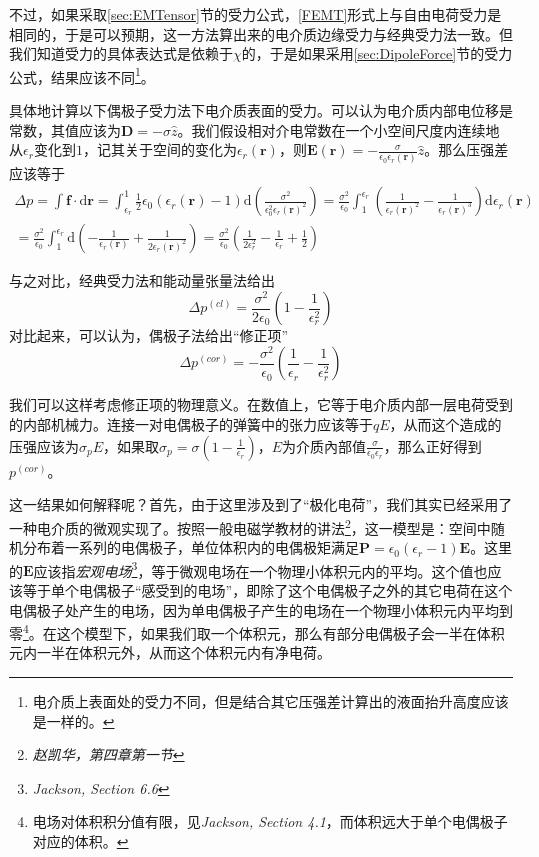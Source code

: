 \documentclass{ctexart}
\newcommand{\epsz}{\epsilon_0}
\newcommand{\epsr}{\epsilon_r}
\begin{document}
	不过，如果采取\ref{sec:EMTensor}节的受力公式，\eqref{FEMT}形式上与自由电荷受力是相同的，于是可以预期，这一方法算出来的电介质边缘受力与经典受力法一致。但我们知道受力的具体表达式是依赖于$\chi$的，于是如果采用\ref{sec:DipoleForce}节的受力公式，结果应该不同\footnote{电介质上表面处的受力不同，但是结合其它压强差计算出的液面抬升高度应该是一样的。}。
	
	具体地计算以下偶极子受力法下电介质表面的受力。可以认为电介质内部电位移是常数，其值应该为$\mathbf D=-\sigma\hat z$。我们假设相对介电常数在一个小空间尺度内连续地从$\epsr$变化到$1$，记其关于空间的变化为$\epsr(\mathbf r)$，则$\mathbf E(\mathbf r)=-\frac{\sigma}{\epsz\epsr(\mathbf r)}\hat z$。那么压强差应该等于
	\begin{multline}
	\Delta p=\int \mathbf f\cdot\mathrm d\mathbf r=\int_{\epsr}^1 \frac{1}{2}\epsz(\epsr(\mathbf r)-1)\mathrm d\left(\frac{\sigma^2}{\epsz^2\epsr(\mathbf r)^2}\right)=\frac{\sigma^2}{\epsz}\int_1^{\epsr}\left(\frac{1}{\epsr(\mathbf r)^2}-\frac{1}{\epsr(\mathbf r)^3}\right)\mathrm d\epsr(\mathbf r)\\
	=\frac{\sigma^2}{\epsz}\int_1^{\epsr}\mathrm d\left(-\frac{1}{\epsr(\mathbf r)}+\frac{1}{2\epsr(\mathbf r)^2}\right)=\frac{\sigma^2}{\epsz}\left(\frac{1}{2\epsr^2}-\frac{1}{\epsr}+\frac{1}{2}\right)
	\end{multline}
	
	与之对比，经典受力法和能动量张量法给出
	\begin{equation}\label{ClassForce1}
	\Delta p^{(cl)}=\frac{\sigma^2}{2\epsz}\left(1-\frac{1}{\epsr^2}\right)
	\end{equation}
	对比起来，可以认为，偶极子法给出“修正项”
	\begin{equation}
	\Delta p^{(cor)}=-\frac{\sigma^2}{\epsz}\left(\frac{1}{\epsr}-\frac{1}{\epsr^2}\right)
	\end{equation}
	
	我们可以这样考虑修正项的物理意义。在数值上，它等于电介质内部一层电荷受到的内部机械力。连接一对电偶极子的弹簧中的张力应该等于$qE$，从而这个造成的压强应该为$\sigma_p E$，如果取$\sigma_p=\sigma(1-\frac{1}{\epsr})$，$E$为介质內部值$\frac{\sigma}{\epsz\epsr}$，那么正好得到$p^{(cor)}$。
	
	这一结果如何解释呢？首先，由于这里涉及到了“极化电荷”，我们其实已经采用了一种电介质的微观实现了。按照一般电磁学教材的讲法\footnote{\textit{赵凯华，第四章第一节}}，这一模型是：空间中随机分布着一系列的电偶极子，单位体积内的电偶极矩满足$\mathbf P=\epsz(\epsr-1)\mathbf E$。这里的$\mathbf E$应该指\textit{宏观电场}\footnote{\textit{Jackson, Section 6.6}}，等于微观电场在一个物理小体积元内的平均。这个值也应该等于单个电偶极子“感受到的电场”，即除了这个电偶极子之外的其它电荷在这个电偶极子处产生的电场，因为单电偶极子产生的电场在一个物理小体积元内平均到零\footnote{电场对体积积分值有限，见\textit{Jackson, Section 4.1}，而体积远大于单个电偶极子对应的体积。}。在这个模型下，如果我们取一个体积元，那么有部分电偶极子会一半在体积元内一半在体积元外，从而这个体积元内有净电荷。
	
\end{document}
